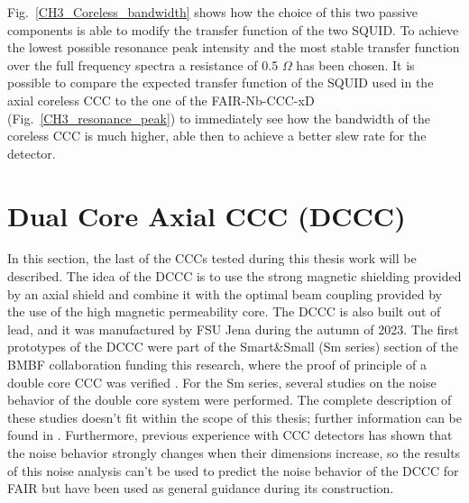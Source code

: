 \documentclass[12pt,a4paper]{report}
\begin{document}
       Fig.~\ref{CH3_Coreless_bandwidth} shows how the choice of this two passive components is able to modify the transfer function of the two SQUID. To achieve the lowest possible resonance peak intensity and the most stable transfer function over the full frequency spectra a resistance of 0.5 $\Omega$ has been chosen. It is possible to compare the expected transfer function of the SQUID used in the axial coreless CCC to the one of the FAIR-Nb-CCC-xD (Fig.~\ref{CH3_resonance_peak}) to immediately see how the bandwidth of the coreless CCC is much higher, able then to achieve a better slew rate for the detector.
       \section{Dual Core Axial CCC (DCCC)}
       In this section, the last of the CCCs tested during this thesis work will be described. The idea of the DCCC is to use the strong magnetic shielding provided by an axial shield and combine it with the optimal beam coupling provided by the use of the high magnetic permeability core. The DCCC is also built out of lead, and it was manufactured by FSU Jena during the autumn of 2023. The first prototypes of the DCCC were part of the Smart\&Small (Sm series) section of the BMBF collaboration funding this research, where the proof of principle of a double core CCC was verified \cite{SmDCCC}. For the Sm series, several studies on the noise behavior of the double core system were performed. The complete description of these studies doesn't fit within the scope of this thesis; further information can be found in \cite{Max_thesis}. Furthermore, previous experience with CCC detectors has shown that the noise behavior strongly changes when their dimensions increase, so the results of this noise analysis can't be used to predict the noise behavior of the DCCC for FAIR but have been used as general guidance during its construction.
\end{document}
